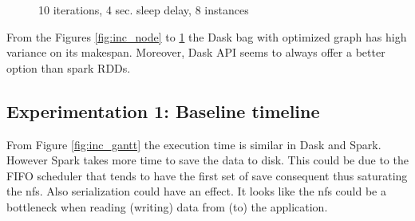 \documentclass[11pt,a4paper]{article}
\begin{document}
\begin{figure}[p]
    \centering
    
    \caption{10 iterations, 4 sec. sleep delay, 8 instances}
    \label{fig:inc_chunk}
\end{figure}

From the Figures \ref{fig:inc_node} to \ref{fig:inc_chunk} the Dask bag with optimized graph
has high variance on its makespan. Moreover, Dask API seems to always offer a better
option than spark RDDs.

\subsection{Experimentation 1: Baseline timeline}
From Figure \ref{fig:inc_gantt} the execution time
is similar in Dask and Spark. However Spark takes more time to save the data to disk.
This could be due to the FIFO scheduler that tends to have the first set of save
consequent thus saturating the nfs. Also serialization could have an effect. It looks
like the nfs could be a bottleneck when reading (writing) data from (to) the
application.
\end{document}
